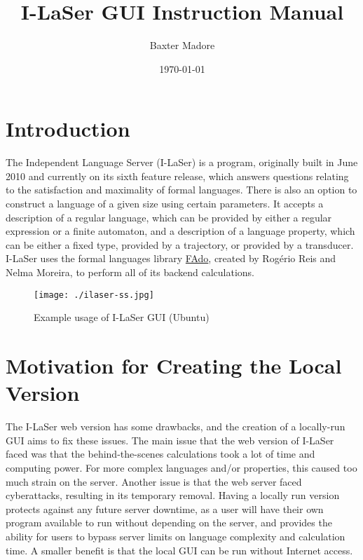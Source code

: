 \documentclass{article}
\title{I-LaSer GUI Instruction Manual}
\author{Baxter Madore}
\date{\today}
\begin{document}
\maketitle
\tableofcontents

\section{Introduction}
\par The Independent Language Server (I-LaSer) is a program, originally built in June 2010 and currently on its sixth feature release, which answers questions relating to the satisfaction and maximality of formal languages.\cite{Properties} There is also an option to construct a language of a given size using certain parameters. It accepts a description of a regular language, which can be provided by either a regular expression or a finite automaton, and a description of a language property, which can be either a fixed type, provided by a trajectory, or provided by a transducer.\cite{LaSer}
I-LaSer uses the formal languages library \href{https://fado.dcc.fc.up.pt/}{FAdo}\cite{FAdo}, created by Rogério Reis and Nelma Moreira, to perform all of its backend calculations.

\begin{center}
\begin{figure}[htb]
\texttt{[image: ./ilaser-ss.jpg]}
\caption{Example usage of I-LaSer GUI (Ubuntu)}
\end{figure}
\end{center}

\section{Motivation for Creating the Local Version}
\par The I-LaSer web version has some drawbacks, and the creation of a locally-run GUI aims to fix these issues.
The main issue that the web version of I-LaSer faced was that the behind-the-scenes calculations took a lot of time and computing power. For more complex languages and/or properties, this caused too much strain on the server. Another issue is that the web server faced cyberattacks, resulting in its temporary removal. Having a locally run version protects against any future server downtime, as a user will have their own program available to run without depending on the server, and provides the ability for users to bypass server limits on language complexity and calculation time. A smaller benefit is that the local GUI can be run without Internet access. 
\end{document}

